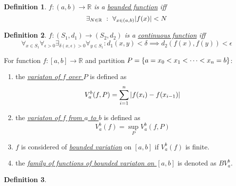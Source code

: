 \documentclass[]{article}
\newcommand{\R}{\mathbb{R}}
\newcommand{\st}{\ : \ }
\newtheorem{definition}{Definition}
\begin{document}
\begin{definition} \label{def:bounded_fun}
    $f : (a,b) \to \R$ is a \emph{\underline{bounded function}} iff \[
        \exists_{N \in \R} \st \forall_{x \in (a,b)} \abs{f(x)} < N
    \]
\end{definition}

\begin{definition} \label{def:cont_fun}
    $f: (S_1, d_1) \to (S_2, d_2)$ is a \underline{\emph{continuous function}} iff \[
        \forall_{x\in S_1} \forall_{\epsilon>0} \exists_{\delta(x,\epsilon)>0} \forall_{y\in S_1} : d_1(x,y) < \delta \implies d_2(f(x),f(y)) < \epsilon
    \]
\end{definition} \label{def:partition_variation}
    For function $f: [a,b] \to \R$ and partition $P = \qty{a = x_0 < x_1 < \cdots < x_n = b}$:
    \begin{enumerate}
        \item the \emph{\underline{variaton of $f$ over $P$}} is defined as\[
            V_{a}^{b}(f,P) = \sum_{i=1}^{n} \abs{f(x_i) - f(x_{i-1})}
        \]
        \item the \emph{\underline{variaton of $f$ from $a$ to $b$}} is defined as\[
            V_{a}^{b}(f) = \sup_{P} V_{a}^{b}(f,P)
        \]
        \item $f$ is considered of \emph{\underline{bounded variation}} on $[a,b]$ if $V_{a}^{b}(f)$ is finite.
        \item the \emph{\underline{family of functions of bounded variaton on $[a,b]$}} is denoted as $BV_{a}^{b}$.
    \end{enumerate}
\begin{definition}
    
\end{definition}
\end{document}
